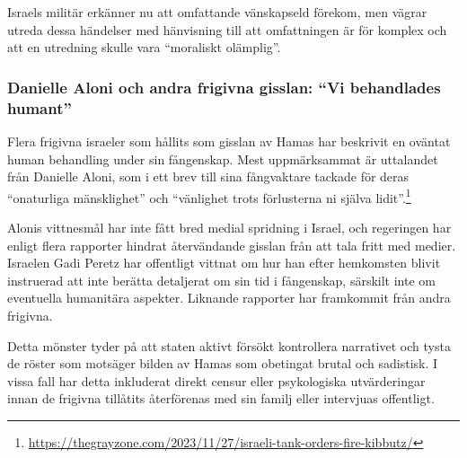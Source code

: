 \documentclass[12pt]{article}
\begin{document}
Israels militär erkänner nu att omfattande vänskapseld förekom, men vägrar utreda dessa händelser med hänvisning till att omfattningen är för komplex och att en utredning skulle vara “moraliskt olämplig”.

\subsubsection*{Danielle Aloni och andra frigivna gisslan: “Vi behandlades humant”}

Flera frigivna israeler som hållits som gisslan av Hamas har beskrivit en oväntat human behandling under sin fångenskap. Mest uppmärksammat är uttalandet från Danielle Aloni, som i ett brev till sina fångvaktare tackade för deras “onaturliga mänsklighet” och “vänlighet trots förlusterna ni själva lidit”.\footnote{\url{https://thegrayzone.com/2023/11/27/israeli-tank-orders-fire-kibbutz/}}

Alonis vittnesmål har inte fått bred medial spridning i Israel, och regeringen har enligt flera rapporter hindrat återvändande gisslan från att tala fritt med medier. Israelen Gadi Peretz har offentligt vittnat om hur han efter hemkomsten blivit instruerad att inte berätta detaljerat om sin tid i fångenskap, särskilt inte om eventuella humanitära aspekter. Liknande rapporter har framkommit från andra frigivna.

Detta mönster tyder på att staten aktivt försökt kontrollera narrativet och tysta de röster som motsäger bilden av Hamas som obetingat brutal och sadistisk. I vissa fall har detta inkluderat direkt censur eller psykologiska utvärderingar innan de frigivna tillåtits återförenas med sin familj eller intervjuas offentligt.
\end{document}
